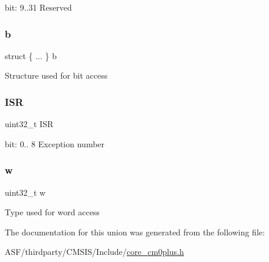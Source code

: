 bit\+: 9..31 Reserved \mbox{\label{union_i_p_s_r___type_a42e56daeef77340dea5ecca578bc9179}} 
\subsubsection{\texorpdfstring{b}{b}}
{\footnotesize\ttfamily struct \{ ... \}   b}

Structure used for bit access \mbox{\label{union_i_p_s_r___type_ad502ba7dbb2aab5f87c782b28f02622d}} 
\subsubsection{\texorpdfstring{ISR}{ISR}}
{\footnotesize\ttfamily uint32\+\_\+t I\+SR}

bit\+: 0.. 8 Exception number \mbox{\label{union_i_p_s_r___type_ad0fb62e7a08e70fc5e0a76b67809f84b}} 
\subsubsection{\texorpdfstring{w}{w}}
{\footnotesize\ttfamily uint32\+\_\+t w}

Type used for word access 

The documentation for this union was generated from the following file\+:\begin{DoxyCompactItemize}
\item 
A\+S\+F/thirdparty/\+C\+M\+S\+I\+S/\+Include/\mbox{\hyperlink{core__cm0plus_8h}{core\+\_\+cm0plus.\+h}}\end{DoxyCompactItemize}
